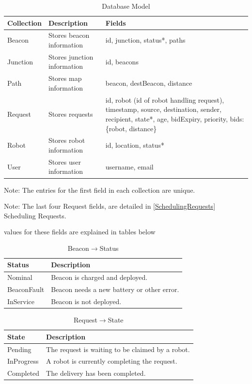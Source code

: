 \documentclass[12pt]{report}
\begin{document}
\begin{table}[H]
\centering
\caption{Database Model}
\label{databaseModel}
\centering
\begin{tabular} { | p{2cm} | p{5cm} | p{7cm} | }
\hline
Collection & Description & Fields \\
\hline
Beacon & Stores beacon information & id, junction, status*, paths \\
\hline
Junction & Stores junction information & id, beacons \\
\hline
Path & Stores map information & beacon, destBeacon, distance \\
\hline
Request & Stores requests & id, robot (id of robot handling request), timestamp, source, destination, sender, recipient, state*, age, bidExpiry, priority, bids: \{robot, distance\} \\
\hline
Robot & Stores robot information & id, location, status* \\
\hline
User & Stores user information & username, email \\
\hline
\end{tabular}
\begin{tablenotes}
      \small
      \centering
      \item Note: The entries for the first field in each collection are unique.
      \item Note: The last four Request fields, are detailed in \ref{SchedulingRequests} Scheduling Requests. 
      \item * values for these fields are explained in tables below
\end{tablenotes}
\end{table}%

\begin{table}[H]
\centering
\caption{Beacon$\rightarrow$Status}
\label{BeaconStatusTable}
\centering
\begin{tabular} { | p{2.5cm} | p{12cm} | }
\hline
Status& Description \\
\hline
Nominal & Beacon is charged and deployed. \\
\hline
BeaconFault & Beacon needs a new battery or other error. \\
\hline
InService & Beacon is not deployed. \\
\hline
\end{tabular}
\end{table}%

\begin{table}[H]
\centering
\caption{Request$\rightarrow$State}
\label{RequestStateTable}
\centering
\begin{tabular} { | p{2.5cm} | p{12cm} | }
\hline
State& Description \\
\hline
Pending & The request is waiting to be claimed by a robot. \\
\hline
InProgress & A robot is currently completing the request. \\
\hline
Completed & The delivery has been completed. \\
\hline
\end{tabular}
\end{table}%
\end{document}
